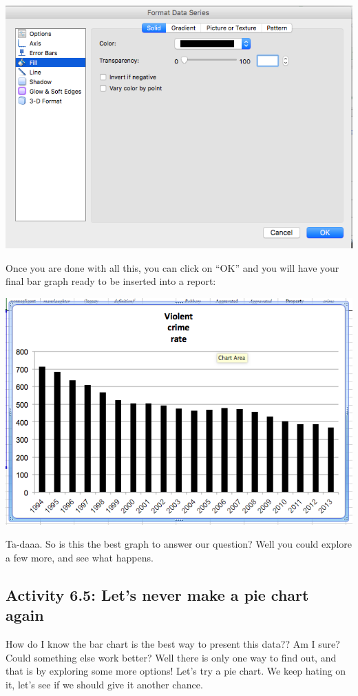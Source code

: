\documentclass[
]{book}
\begin{document}
\includegraphics{imgs/desc_viz_13.png}

Once you are done with all this, you can click on ``OK'' and you will have your final bar graph ready to be inserted into a report:

\includegraphics{imgs/final_bar.png}

Ta-daaa. So is this the best graph to answer our question? Well you could explore a few more, and see what happens.

\hypertarget{activity-6.5-lets-never-make-a-pie-chart-again}{%
\subsection{Activity 6.5: Let's never make a pie chart again}\label{activity-6.5-lets-never-make-a-pie-chart-again}}

How do I know the bar chart is the best way to present this data?? Am I sure? Could something else work better? Well there is only one way to find out, and that is by exploring some more options! Let's try a pie chart. We keep hating on it, let's see if we should give it another chance.
\end{document}
